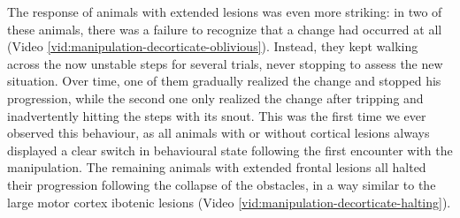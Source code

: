 The response of animals with extended lesions was even more striking: in two of these animals, there was a failure to recognize that a change had occurred at all (Video \ref{vid:manipulation-decorticate-oblivious}). Instead, they kept walking across the now unstable steps for several trials, never stopping to assess the new situation. Over time, one of them gradually realized the change and stopped his progression, while the second one only realized the change after tripping and inadvertently hitting the steps with its snout. This was the first time we ever observed this behaviour, as all animals with or without cortical lesions always displayed a clear switch in behavioural state following the first encounter with the manipulation. The remaining animals with extended frontal lesions all halted their progression following the collapse of the obstacles, in a way similar to the large motor cortex ibotenic lesions (Video \ref{vid:manipulation-decorticate-halting}).
